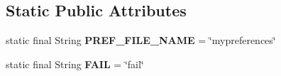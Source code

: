 \subsection*{Static Public Attributes}
\begin{DoxyCompactItemize}
\item 
static final String {\bfseries P\+R\+E\+F\+\_\+\+F\+I\+L\+E\+\_\+\+N\+A\+ME} = \char`\"{}mypreferences\char`\"{}\hypertarget{classcom_1_1example_1_1sebastian_1_1tindertp_1_1commonTools_1_1Common_aeb358b9fe25b404b743511e48d847bab}{}\label{classcom_1_1example_1_1sebastian_1_1tindertp_1_1commonTools_1_1Common_aeb358b9fe25b404b743511e48d847bab}

\item 
static final String {\bfseries F\+A\+IL} = \char`\"{}fail\char`\"{}\hypertarget{classcom_1_1example_1_1sebastian_1_1tindertp_1_1commonTools_1_1Common_a3531763c9b7d3f152c3f1cac8f9ad0ab}{}\label{classcom_1_1example_1_1sebastian_1_1tindertp_1_1commonTools_1_1Common_a3531763c9b7d3f152c3f1cac8f9ad0ab}


\end{DoxyCompactItemize}
